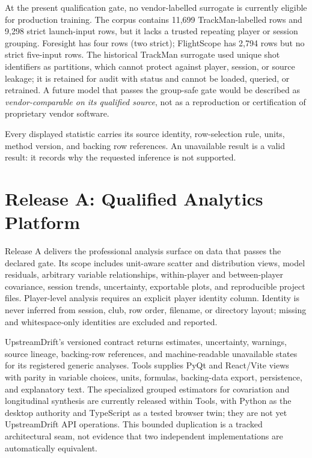 At the present qualification gate, no vendor-labelled surrogate is currently eligible
for production training. The corpus contains 11,699 TrackMan-labelled
rows and 9,298 strict launch-input rows, but it lacks a trusted repeating
player or session grouping. Foresight has four rows (two strict); FlightScope
has 2,794 rows but no strict five-input rows. The historical TrackMan surrogate
used unique shot identifiers as partitions, which cannot protect against
player, session, or source leakage; it is retained for audit with status
 and cannot be loaded, queried, or retrained.
A future model that passes the group-safe gate would be described as
\emph{vendor-comparable on its qualified source}, not as a reproduction or
certification of proprietary vendor software.

\newpage
\begin{keypoint}
Every displayed statistic carries its source identity, row-selection rule,
units, method version, and backing row references. An unavailable result is a
valid result: it records why the requested inference is not supported.
\end{keypoint}

\section{Release A: Qualified Analytics Platform}

Release A delivers the professional analysis surface on data that passes the
declared gate. Its scope includes unit-aware scatter and distribution views,
model residuals, arbitrary variable relationships, within-player and
between-player covariance, session trends, uncertainty, exportable plots,
and reproducible project files. Player-level analysis requires an explicit
player identity column. Identity is never inferred from session, club, row
order, filename, or directory layout; missing and whitespace-only identities
are excluded and reported.

UpstreamDrift's versioned contract returns estimates, uncertainty, warnings,
source lineage, backing-row references, and machine-readable unavailable
states for its registered generic analyses. Tools supplies PyQt and React/Vite
views with parity in variable choices, units, formulas, backing-data export,
persistence, and explanatory text. The specialized grouped estimators for
covariation and longitudinal synthesis are currently released within Tools,
with Python as the desktop authority and TypeScript as a tested browser twin;
they are not yet UpstreamDrift API operations. This bounded duplication is a
tracked architectural seam, not evidence that two independent implementations
are automatically equivalent.

